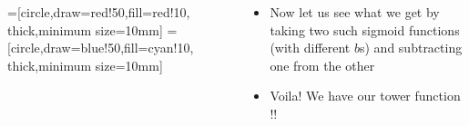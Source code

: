\documentclass[serif, aspectratio=169]{beamer}
\begin{document}
\begin{frame}
\begin{columns}
\begin{overlayarea}{\textwidth}{\textheight}

=[circle,draw=red!50,fill=red!10, thick,minimum size=10mm]
=[circle,draw=blue!50,fill=cyan!10, thick,minimum size=10mm]
\end{overlayarea}


\begin{overlayarea}{\textwidth}{\textheight}
\begin{itemize}\justifying
\item Now let us see what we get by taking two such sigmoid functions (with different $b$s) and subtracting one from the other
\item<4-> Voila! We have our tower function !!
\end{itemize}
\end{overlayarea}
\end{columns}
\end{frame}
\end{document}
